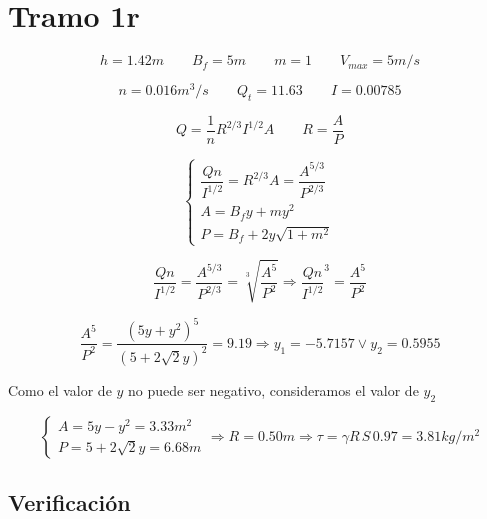 \section*{Tramo 1r}


\begin{equation*}
  h = 1.42 m
 \qquad
  B_{f} = 5 m
 \qquad
  m = 1
 \qquad
  V_{max} = 5 m/s
\end{equation*}

\begin{equation*}
  n = 0.016 m^3/s
 \qquad
  Q_{t} = 11.63
 \qquad
  I = 0.00785
\end{equation*}

\begin{equation*}
 Q = \frac{1}{n} R^{2/3} I^{1/2} A
 \qquad
 R = \frac{A}{P}
\end{equation*}

\begin{equation*}
  \begin{cases}
    \dfrac{Q n}{I^{1/2}} = R^{2/3} A = \dfrac{A^{5/3}}{P^{2/3}} \\
    A = B_{f}y + m y^{2} \\
    P = B_{f} + 2 y \sqrt{1 + m^{2}}
  \end{cases}
\end{equation*}

\begin{equation*}
  \dfrac{Q n}{I^{1/2}} = \dfrac{A^{5/3}}{P^{2/3}} = \sqrt[3]{\dfrac{A^{5}}{P^{2}}}
  \Longrightarrow
  \dfrac{Q n}{I^{1/2}}^{3} = \dfrac{A^{5}}{P^{2}}
\end{equation*}

\begin{equation*}
  \dfrac{A^{5}}{P^{2}} = \dfrac{(5 y + y^{2})^{5}}{(5 + 2 \sqrt{2} y)^{2}} = 9.19
  \Longrightarrow
  y_{1} = -5.7157 \vee y_{2} = 0.5955
\end{equation*}

Como el valor de $y$ no puede ser negativo, consideramos el valor de $y_{2}$

\begin{equation*}
  \begin{cases}
    A = 5 y - y^{2} = 3.33 m^{2} \\
    P = 5 + 2 \sqrt{2} y = 6.68 m
  \end{cases}
  \Longrightarrow
  R = 0.50 m
  \Longrightarrow
  \tau = \gamma R \, S \, 0.97 = 3.81 kg/m^{2}
\end{equation*}


\subsection*{Verificación}

